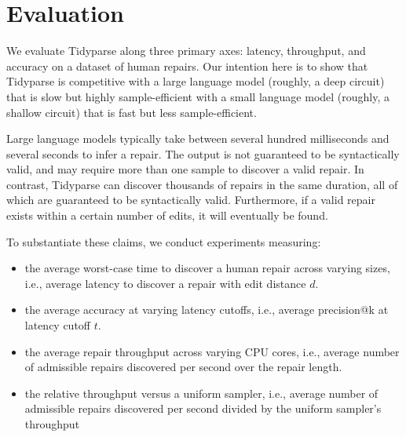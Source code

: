 \documentclass[runningheads]{llncs}
\begin{document}
\begin{figure}
\end{figure}

\section{Evaluation}

We evaluate Tidyparse along three primary axes: latency, throughput, and accuracy on a dataset of human repairs. Our intention here is to show that Tidyparse is competitive with a large language model (roughly, a deep circuit) that is slow but highly sample-efficient with a small language model (roughly, a shallow circuit) that is fast but less sample-efficient.

Large language models typically take between several hundred milliseconds and several seconds to infer a repair. The output is not guaranteed to be syntactically valid, and may require more than one sample to discover a valid repair. In contrast, Tidyparse can discover thousands of repairs in the same duration, all of which are guaranteed to be syntactically valid. Furthermore, if a valid repair exists within a certain number of edits, it will eventually be found.

To substantiate these claims, we conduct experiments measuring:

\begin{itemize}
  \item the average worst-case time to discover a human repair across varying sizes, i.e., average latency to discover a repair with edit distance $d$.
  \item the average accuracy at varying latency cutoffs, i.e., average precision@k at latency cutoff $t$.
  \item the average repair throughput across varying CPU cores, i.e., average number of admissible repairs discovered per second over the repair length.
  \item the relative throughput versus a uniform sampler, i.e., average number of admissible repairs discovered per second divided by the uniform sampler's throughput
\end{itemize}
\end{document}
